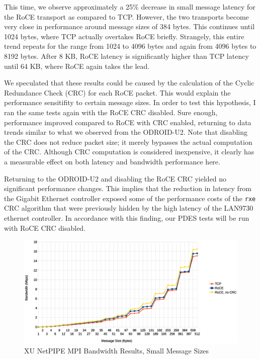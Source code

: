 \documentclass[11pt]{book}
\begin{document}
This time, we observe approximately a 25\% decrease in small message latency for the RoCE
transport as compared to TCP.  However, the two transports become very close in
performance around message sizes of 384 bytes.  This continues until 1024 bytes, where TCP
actually overtakes RoCE briefly.  Strangely, this entire trend repeats for the range from
1024 to 4096 bytes and again from 4096 bytes to 8192 bytes. After 8 KB, RoCE latency is
significantly higher than TCP latency until 64 KB, where RoCE again takes the lead.

We speculated that these results could be caused by the calculation of the Cyclic
Redundance Check (CRC) for each RoCE packet.  This would explain the performance
sensitifity to certain message sizes. In order to test this hypothesis, I ran the same
tests again with the RoCE CRC disabled. Sure enough, performance improved compared to RoCE
with CRC enabled, returning to data trends similar to what we observed from the
ODROID-U2. Note that disabling the CRC does not reduce packet size; it merely bypasses the
actual computation of the CRC. Although CRC computation is considered inexpensive, it
clearly has a measurable effect on both latency and bandwidth performance here.

Returning to the ODROID-U2 and disabling the RoCE CRC yielded no significant
performance changes. This implies that the reduction in latency from the Gigabit
Ethernet controller exposed some of the performance costs of the \verb;rxe; CRC
algorithm that were previously hidden by the high latency of the LAN9730
ethernet controller. In accordance with this finding, our PDES tests will be run
with RoCE CRC disabled.

\begin{figure}
\includegraphics[width=\textwidth]{xu_bw_small}
\caption{XU NetPIPE MPI Bandwidth Results, Small Message Sizes}
\label{xu-bw-small}
\end{figure}
\end{document}
